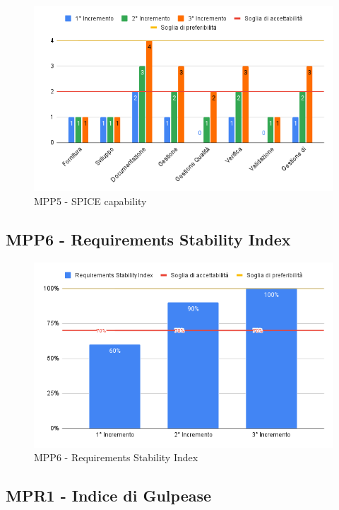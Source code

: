 \begin{figure}[H]
	\centering
	\includegraphics[scale = 0.6]{sezioni/Images/SPICECapability.png}
	\caption{MPP5 - SPICE capability}
\end{figure}

\subsection{MPP6 - Requirements Stability Index}

\begin{figure}[H]
	\centering
	\includegraphics[scale = 0.6]{sezioni/Images/RequirementsStabilityIndex.png}
	\caption{MPP6 - Requirements Stability Index}
\end{figure}

\subsection{MPR1 - Indice di Gulpease}

